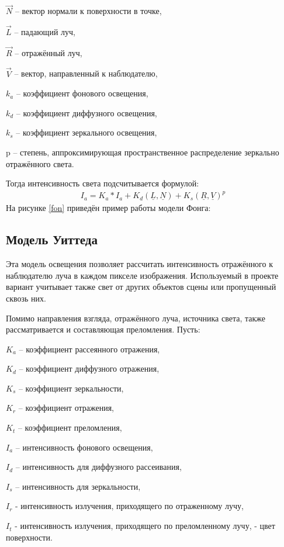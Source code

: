 	$\vec{N}$ -- вектор нормали к поверхности в точке, 
	
	$\vec{L}$ -- падающий луч, 
	
	$\vec{R}$ -- отражённый луч, 
	
	$\vec{V}$ -- вектор, направленный к наблюдателю, 
	
	$k_a$ -- коэффициент фонового освещения, 
	
	$k_d$ -- коэффициент диффузного освещения,
	
	$k_s$ -- коэффициент зеркального освещения, 
	
	p -- степень, аппроксимирующая пространственное распределение зеркально отражённого света. 
	
	Тогда интенсивность света подсчитывается формулой:
	\begin{align}
	I_a = K_a * I_a + K_d(\underline{L}, \underline{N}) + K_s(\underline{R}, \underline{V})^p
	\end{align}
	На рисунке \ref{fon} приведён пример работы модели Фонга:
	\subsection{Модель Уиттеда}
	Эта модель освещения позволяет рассчитать интенсивность отражённого к наблюдателю луча в каждом пикселе изображения. Используемый в проекте вариант учитывает также свет от других объектов сцены или пропущенный сквозь них. 
	
	Помимо направления взгляда, отражённого луча, источника света, также рассматривается и составляющая преломления.
	Пусть:
	
	$K_a$ – коэффициент рассеянного отражения,
	
	$K_d$ – коэффициент диффузного отражения, 
	
	$K_s$ – коэффициент зеркальности, 
	
	$K_r$ – коэффициент отражения, 
	
	$K_t$ – коэффициент преломления, 
	
	$I_a$ – интенсивность фонового освещения, 
	
	$I_d$ – интенсивность для диффузного рассеивания, 
	
	$I_s$ – интенсивность для зеркальности,
	
	$I_r$ - интенсивность излучения, приходящего по отраженному лучу, 
	
	$I_t$ - интенсивность излучения, приходящего по преломленному лучу, - цвет поверхности.
	
